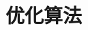 \setcounter{chapter}{4}

\hypertarget{ux4f18ux5316ux7b97ux6cd5}{%
\chapter{优化算法}\label{ux4f18ux5316ux7b97ux6cd5}}
